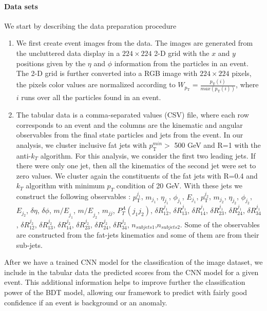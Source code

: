 \documentclass[a4paper,11pt]{article}
\begin{document}
\paragraph{Data sets}
We start by describing the data preparation procedure
\begin{enumerate}
\item  We first create event images from the data. The images are generated from the uncluttered data display in a $224\times 224$ 2-D grid with the $x$ and $y$ positions given by the $\eta$ and $\phi$ information from the particles in an event. The 2-D grid is further converted into a RGB image with $224\times 224$ pixels, the pixels color values are normalized according to $W_{p_\text{T}} = \frac{p_\text{T}(i)}{max(p_\text{T}(i))}$, where $i$ runs over all the particles found in an event. 

\item The tabular data is a comma-separated values (CSV) file, where each row corresponds to an event and the columns are the kinematic and angular observables from the final state particles and jets from the event. In our analysis, we cluster  inclusive fat jets with $p_\text{T}^{min}>$ 500 GeV and R=1 with the anti-$k_T$ algorithm. For this analysis, we consider the first two leading jets. If there were only one jet, then all the kinematics of the second jet were set to zero values. We cluster again the constituents of the fat jets with R=0.4  and $k_T$ algorithm with minimum $p_T$ condition of 20 GeV. With these jets we construct the following observables :
$p_\text{T}^{j_1}$, $m_{j_1}$, $\eta_{j_1}$, $\phi_{j_1}$, $E_{j_1}$, 
$p_\text{T}^{j_2}$, $m_{j_2}$, $\eta_{j_2}$, $\phi_{j_2}$, $E_{j_2}$,
$\delta \eta$, $\delta \phi$, ${m/E}_{j_1}$, ${m/E}_{j_2}$,
$m_{jj}$, $P_T^A (j_1j_2)$, $\delta R^{j_1}_{12}$, $\delta R^{j_1}_{13}$,
$\delta R^{j_1}_{14}$, $\delta R^{j_1}_{23}$, 
$\delta R^{j_1}_{24}$, $\delta R^{j_1}_{34}$,
$\delta R^{j_2}_{12}$, $\delta R^{j_2}_{13}$,
$\delta R^{j_2}_{14}$, $\delta R^{j_2}_{23}$, 
$\delta R^{j_2}_{24}$, $\delta R^{j_2}_{34}$,
$n_{subjets1}$,$n_{subjets2}$. Some of the observables are constructed from the fat-jets kinematics and some of them are from their sub-jets.
\end{enumerate}

After we have a trained CNN model for the classification of the image dataset, we include in the tabular data the predicted scores from the CNN model for a given event. This additional information helps to improve further the classification power of the BDT model, allowing our framework to predict with fairly good confidence if an event is background or an anomaly.
\end{document}
